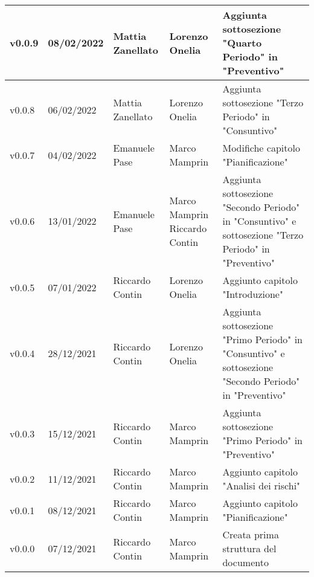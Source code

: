 {\begin{longtable}{|C{1.8cm}|C{2.1cm}|C{2cm}|C{2.4cm}|L{4.4cm}|}
  v0.0.9        & 08/02/2022    & Mattia Zanellato  & Lorenzo Onelia                  & Aggiunta sottosezione "Quarto Periodo" in "Preventivo" \\ \hline
  v0.0.8        & 06/02/2022    & Mattia Zanellato  & Lorenzo Onelia                  & Aggiunta sottosezione "Terzo Periodo" in "Consuntivo" \\ \hline
  v0.0.7        & 04/02/2022    & Emanuele Pase     & Marco Mamprin                   & Modifiche capitolo "Pianificazione" \\ \hline
  v0.0.6        & 13/01/2022    & Emanuele Pase     & Marco Mamprin Riccardo Contin   & Aggiunta sottosezione "Secondo Periodo" in "Consuntivo" e sottosezione "Terzo Periodo" in "Preventivo" \\ \hline
  v0.0.5        & 07/01/2022    & Riccardo Contin   & Lorenzo Onelia                  & Aggiunto capitolo "Introduzione" \\ \hline
  v0.0.4        & 28/12/2021    & Riccardo Contin   & Lorenzo Onelia                  & Aggiunta sottosezione "Primo Periodo" in "Consuntivo" e sottosezione "Secondo Periodo" in "Preventivo" \\ \hline
  v0.0.3        & 15/12/2021    & Riccardo Contin   & Marco Mamprin                   & Aggiunta sottosezione "Primo Periodo" in "Preventivo" \\ \hline
  v0.0.2        & 11/12/2021    & Riccardo Contin   & Marco Mamprin                   & Aggiunto capitolo "Analisi dei rischi" \\ \hline
  v0.0.1        & 08/12/2021    & Riccardo Contin   & Marco Mamprin                   & Aggiunto capitolo "Pianificazione" \\ \hline
  v0.0.0        & 07/12/2021    & Riccardo Contin   & Marco Mamprin                   & Creata prima struttura del documento \\ \hline
\end{longtable}}

\renewcommand\arraystretch{1}
